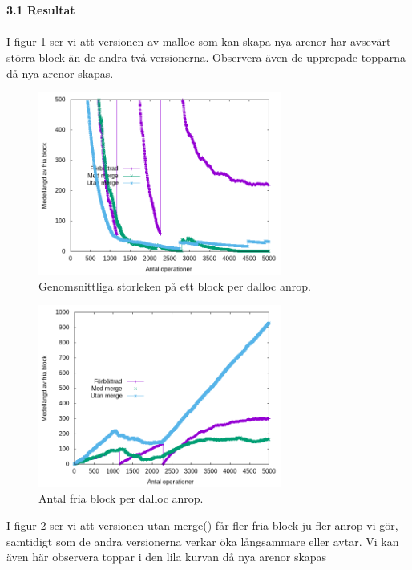 \documentclass[a4paper,10pt]{article}
\begin{document}
\maketitle
\textbf
    {\\\\3.1 Resultat\\\\}
    I figur 1 ser vi att versionen av malloc som kan skapa nya arenor har avsevärt störra block än de andra två versionerna. Observera även de upprepade topparna då nya arenor skapas. 
    \begin{figure}[htp]
    \centering
    \includegraphics[width=8cm]{benchmark_opsize/all3_sizeops_zoom.png}
    \caption{Genomsnittliga storleken på ett block per dalloc anrop.}
    \label{fig:Graph}
    \end{figure}
    
    
    \begin{figure}[htp]
    \centering
    \includegraphics[width=8cm]{benchmark_opsize/all3_lenops.png}
    \caption{Antal fria block per dalloc anrop.}
    \label{fig:Graph}
    \end{figure}
        I figur 2 ser vi att versionen utan merge() får fler fria block ju fler anrop vi gör, samtidigt som de andra versionerna verkar öka långsammare eller avtar. Vi kan även här observera toppar i den lila kurvan då nya arenor skapas
\end{document}
